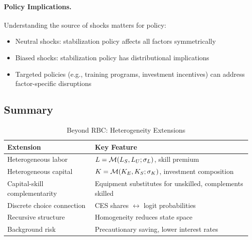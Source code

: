 \paragraph{Policy Implications.}
Understanding the source of shocks matters for policy:
\begin{itemize}[nosep]
\item Neutral shocks: stabilization policy affects all factors symmetrically
\item Biased shocks: stabilization policy has distributional implications
\item Targeted policies (e.g., training programs, investment incentives) can address factor-specific disruptions
\end{itemize}

\subsection{Summary}
\label{subsec:beyond-rbc-summary}

\begin{table}[H]
\centering
\caption{Beyond RBC: Heterogeneity Extensions}
\label{tab:beyond-rbc-summary}
\renewcommand{\arraystretch}{1.6}
\begin{tabular}{@{}ll@{}}
\toprule
\textbf{Extension} & \textbf{Key Feature} \\
\midrule
Heterogeneous labor & $L = \mathcal{M}(L_S, L_U; \sigma_L)$, skill premium \\[6pt]
Heterogeneous capital & $K = \mathcal{M}(K_E, K_S; \sigma_K)$, investment composition \\[6pt]
Capital-skill complementarity & Equipment substitutes for unskilled, complements skilled \\[6pt]
Discrete choice connection & CES shares $\leftrightarrow$ logit probabilities \\[6pt]
Recursive structure & Homogeneity reduces state space \\[6pt]
Background risk & Precautionary saving, lower interest rates \\[6pt]
\bottomrule
\end{tabular}
\end{table}

